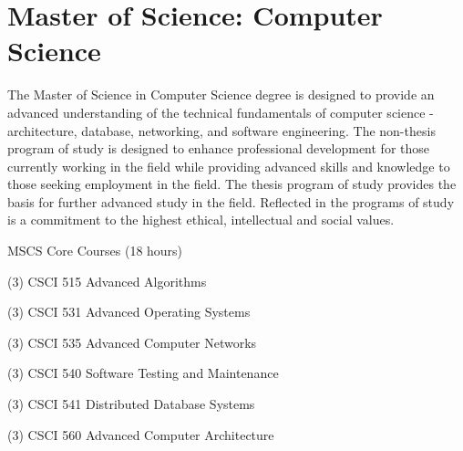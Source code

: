 %
\section*{Master of Science: Computer Science}

The Master of Science in Computer Science degree is designed to provide an advanced understanding of the technical fundamentals of computer science - architecture, database, networking, and software engineering. The non-thesis program of study is designed to enhance professional development for those currently working in the field while providing advanced skills and knowledge to those seeking employment in the field. The thesis program of study provides the basis for further advanced study in the field. Reflected in the programs of study is a commitment to the highest ethical, intellectual and social values.

\begin{reqgroup}{MSCS Core Courses (18 hours)}
\begin{checklist}
\begin{minipage}[t]{0.5\linewidth}
	\item (3) CSCI 515  Advanced Algorithms
	\item (3) CSCI 531  Advanced Operating Systems
	\item (3) CSCI 535  Advanced Computer Networks
\end{minipage}
\begin{minipage}[t]{0.5\linewidth}
	\item (3) CSCI 540  Software Testing and Maintenance
	\item (3) CSCI 541  Distributed Database Systems
	\item (3) CSCI 560  Advanced Computer Architecture
\end{minipage}
\end{checklist}
\end{reqgroup}


